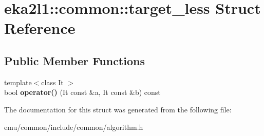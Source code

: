 \hypertarget{structeka2l1_1_1common_1_1target__less}{}\section{eka2l1\+:\+:common\+:\+:target\+\_\+less Struct Reference}
\label{structeka2l1_1_1common_1_1target__less}
\subsection*{Public Member Functions}
\begin{DoxyCompactItemize}
\item 
\mbox{\label{structeka2l1_1_1common_1_1target__less_ab9d62d5cec57ffcfa10a89fe635246fb}} 
{\footnotesize template$<$class It $>$ }\\bool {\bfseries operator()} (It const \&a, It const \&b) const
\end{DoxyCompactItemize}


The documentation for this struct was generated from the following file\+:\begin{DoxyCompactItemize}
\item 
emu/common/include/common/algorithm.\+h\end{DoxyCompactItemize}
